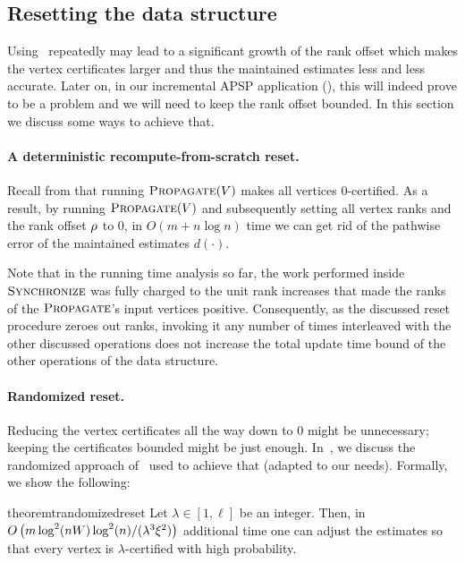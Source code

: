 \documentclass[11pt,letterpaper]{article}
\theoremstyle{plain}
\renewcommand{\O}{O}
\DeclareMathOperator*{\PD}{\textsc{Propagate}}
\begin{document}
\subsection{Resetting the data structure}\label{sec:resetting}
Using~ repeatedly may lead to a significant growth of the rank offset
which makes the vertex certificates larger and thus the maintained estimates less and less accurate.
Later on, in our incremental APSP application (), this will indeed prove to be a problem
and we will need to keep the rank offset bounded.
In this section we discuss some ways to achieve that.
\paragraph{A deterministic recompute-from-scratch reset.}
Recall from  that running \linebreak $\PD(V)$ makes all vertices $0$-certified.
As a result, by running $\PD(V)$ and subsequently setting all vertex ranks
and the rank offset $\rho$ to $0$, in $\O(m+n\log{n})$ time we can get rid of
the pathwise error of the maintained estimates $d(\cdot)$.

Note that in the running time analysis so far, the work performed
inside $\textsc{Synchronize}$ was fully charged to the unit rank increases that made the ranks of the $\PD$'s input vertices positive.
Consequently, as the discussed reset procedure zeroes out ranks, invoking it any number of times interleaved with
the other discussed operations does not increase
the total update time bound of the other operations of the data structure.

\paragraph{Randomized reset.}
Reducing the vertex certificates all the way down to $0$ might be unnecessary; keeping the certificates
bounded might be just enough.
In~, we discuss the randomized approach of~\cite{ChechikZ21} used to achieve that (adapted to our needs).
Formally, we show the following:

\newcommand{\bal}{\lambda}

\begin{restatable}{theorem}{trandomizedreset}\label{t:randomized-reset}
Let $\bal\in [1,\ell]$ be an integer. Then, in $\O\left(m\log^2(nW)\log^2(n)/(\bal^3\epsp^2)\right)$ additional time
one can adjust the estimates so that every vertex is $\lambda$-certified with high probability.
\end{restatable}
\end{document}
